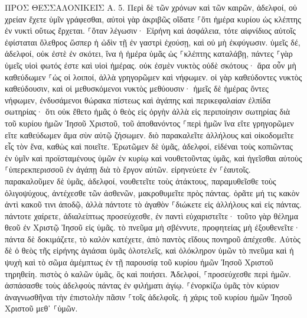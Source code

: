 \documentclass[twoside, 9pt]{extreport}
\begin{document}
ΠΡΟΣ ΘΕΣΣΑΛΟΝΙΚΕΙΣ Α.
5.
Περὶ δὲ τῶν χρόνων καὶ τῶν καιρῶν, ἀδελφοί, οὐ χρείαν ἔχετε ὑμῖν γράφεσθαι, 
αὐτοὶ γὰρ ἀκριβῶς οἴδατε ⸀ὅτι ἡμέρα κυρίου ὡς κλέπτης ἐν νυκτὶ οὕτως ἔρχεται. 
⸀ὅταν λέγωσιν· Εἰρήνη καὶ ἀσφάλεια, τότε αἰφνίδιος αὐτοῖς ἐφίσταται ὄλεθρος ὥσπερ ἡ ὠδὶν τῇ ἐν γαστρὶ ἐχούσῃ, καὶ οὐ μὴ ἐκφύγωσιν. 
ὑμεῖς δέ, ἀδελφοί, οὐκ ἐστὲ ἐν σκότει, ἵνα ἡ ἡμέρα ὑμᾶς ὡς ⸀κλέπτης καταλάβῃ, 
πάντες ⸀γὰρ ὑμεῖς υἱοὶ φωτός ἐστε καὶ υἱοὶ ἡμέρας. οὐκ ἐσμὲν νυκτὸς οὐδὲ σκότους· 
ἄρα οὖν μὴ καθεύδωμεν ⸀ὡς οἱ λοιποί, ἀλλὰ γρηγορῶμεν καὶ νήφωμεν. 
οἱ γὰρ καθεύδοντες νυκτὸς καθεύδουσιν, καὶ οἱ μεθυσκόμενοι νυκτὸς μεθύουσιν· 
ἡμεῖς δὲ ἡμέρας ὄντες νήφωμεν, ἐνδυσάμενοι θώρακα πίστεως καὶ ἀγάπης καὶ περικεφαλαίαν ἐλπίδα σωτηρίας· 
ὅτι οὐκ ἔθετο ἡμᾶς ὁ θεὸς εἰς ὀργὴν ἀλλὰ εἰς περιποίησιν σωτηρίας διὰ τοῦ κυρίου ἡμῶν Ἰησοῦ Χριστοῦ, 
τοῦ ἀποθανόντος ⸀περὶ ἡμῶν ἵνα εἴτε γρηγορῶμεν εἴτε καθεύδωμεν ἅμα σὺν αὐτῷ ζήσωμεν. 
διὸ παρακαλεῖτε ἀλλήλους καὶ οἰκοδομεῖτε εἷς τὸν ἕνα, καθὼς καὶ ποιεῖτε. 
Ἐρωτῶμεν δὲ ὑμᾶς, ἀδελφοί, εἰδέναι τοὺς κοπιῶντας ἐν ὑμῖν καὶ προϊσταμένους ὑμῶν ἐν κυρίῳ καὶ νουθετοῦντας ὑμᾶς, 
καὶ ἡγεῖσθαι αὐτοὺς ⸀ὑπερεκπερισσοῦ ἐν ἀγάπῃ διὰ τὸ ἔργον αὐτῶν. εἰρηνεύετε ἐν ⸀ἑαυτοῖς. 
παρακαλοῦμεν δὲ ὑμᾶς, ἀδελφοί, νουθετεῖτε τοὺς ἀτάκτους, παραμυθεῖσθε τοὺς ὀλιγοψύχους, ἀντέχεσθε τῶν ἀσθενῶν, μακροθυμεῖτε πρὸς πάντας. 
ὁρᾶτε μή τις κακὸν ἀντὶ κακοῦ τινι ἀποδῷ, ἀλλὰ πάντοτε τὸ ἀγαθὸν ⸀διώκετε εἰς ἀλλήλους καὶ εἰς πάντας. 
πάντοτε χαίρετε, 
ἀδιαλείπτως προσεύχεσθε, 
ἐν παντὶ εὐχαριστεῖτε· τοῦτο γὰρ θέλημα θεοῦ ἐν Χριστῷ Ἰησοῦ εἰς ὑμᾶς. 
τὸ πνεῦμα μὴ σβέννυτε, 
προφητείας μὴ ἐξουθενεῖτε· 
πάντα δὲ δοκιμάζετε, τὸ καλὸν κατέχετε, 
ἀπὸ παντὸς εἴδους πονηροῦ ἀπέχεσθε. 
Αὐτὸς δὲ ὁ θεὸς τῆς εἰρήνης ἁγιάσαι ὑμᾶς ὁλοτελεῖς, καὶ ὁλόκληρον ὑμῶν τὸ πνεῦμα καὶ ἡ ψυχὴ καὶ τὸ σῶμα ἀμέμπτως ἐν τῇ παρουσίᾳ τοῦ κυρίου ἡμῶν Ἰησοῦ Χριστοῦ τηρηθείη. 
πιστὸς ὁ καλῶν ὑμᾶς, ὃς καὶ ποιήσει. 
Ἀδελφοί, ⸀προσεύχεσθε περὶ ἡμῶν. 
ἀσπάσασθε τοὺς ἀδελφοὺς πάντας ἐν φιλήματι ἁγίῳ. 
⸀ἐνορκίζω ὑμᾶς τὸν κύριον ἀναγνωσθῆναι τὴν ἐπιστολὴν πᾶσιν ⸀τοῖς ἀδελφοῖς. 
ἡ χάρις τοῦ κυρίου ἡμῶν Ἰησοῦ Χριστοῦ μεθ᾽ ⸀ὑμῶν. 
\end{document}
